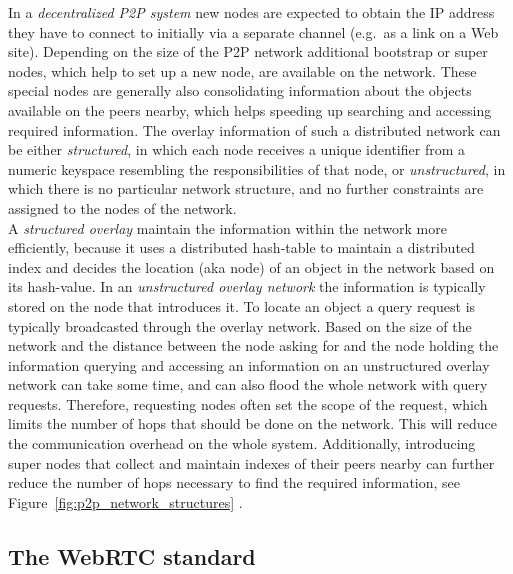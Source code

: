 In a \emph{decentralized \gls{P2P} system} new nodes are expected to obtain the \gls{IP} address they have to connect to initially via a separate channel (e.g.\ as a link on a Web site). Depending on the size of the \gls{P2P} network additional bootstrap or super nodes, which help to set up a new node, are available on the network. These special nodes are generally also consolidating information about the objects available on the peers nearby, which helps speeding up searching and accessing required information. The overlay information of such a distributed network can be either \emph{structured}, in which each node receives a unique identifier from a numeric keyspace resembling the responsibilities of that node, or \emph{unstructured}, in which there is no particular network structure, and no further constraints are assigned to the nodes of the network. \\

A \emph{structured overlay} maintain the information within the network more efficiently, because it uses a distributed hash-table to maintain a distributed index and decides the location (aka node) of an object in the network based on its hash-value. In an \emph{unstructured overlay network} the information is typically stored on the node that introduces it. To locate an object a query request is typically broadcasted through the overlay network. Based on the size of the network and the distance between the node asking for and the node holding the information querying and accessing an information on an unstructured overlay network can take some time, and can also flood the whole network with query requests. Therefore, requesting nodes often set the scope of the request, which limits the number of hops that should be done on the network. This will reduce the communication overhead on the whole system. Additionally, introducing super nodes that collect and maintain indexes of their peers nearby can further reduce the number of hops necessary to find the required information, see Figure~\ref{fig:p2p_network_structures} \citep{rodrigues2010peer}. \@


\subsection{The \gls{WebRTC} standard}
\label{sec:p2p_webrtc}

